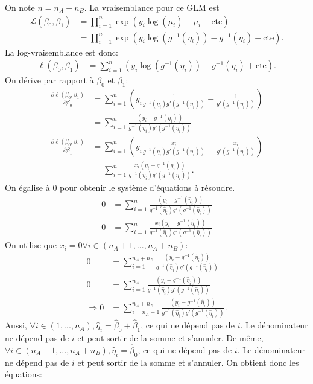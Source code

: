 \begin{solution}{6.3}
On note $n=n_A+n_B$. La vraisemblance pour ce GLM est
\begin{align*}
\mathcal{L}(\beta_0,\beta_1)&=\prod_{i=1}^n \exp(y_i\log(\mu_i)-\mu_i+\mbox{cte})\\
&=\prod_{i=1}^n \exp(y_i\log(g^{-1}(\eta_i))-g^{-1}(\eta_i)+\mbox{cte}).
\end{align*}
La log-vraisemblance est donc:
\begin{align*}
\ell(\beta_0,\beta_1)&=\sum_{i=1}^n (y_i\log(g^{-1}(\eta_i))-g^{-1}(\eta_i)+\mbox{cte}).
\end{align*}
On dérive par rapport à $\beta_0$ et $\beta_1$:
\begin{align*}
\frac{\partial \ell(\beta_0,\beta_1)}{\partial\beta_0}&=\sum_{i=1}^n (y_i\frac{1}{g^{-1}(\eta_i)g'(g^{-1}(\eta_i))}-\frac{1}{g'(g^{-1}(\eta_i))})\\
&=\sum_{i=1}^n \frac{(y_i-g^{-1}(\eta_i))}{g^{-1}(\eta_i)g'(g^{-1}(\eta_i))}\\
\frac{\partial \ell(\beta_0,\beta_1)}{\partial\beta_1}&=\sum_{i=1}^n (y_i\frac{x_i}{g^{-1}(\eta_i)g'(g^{-1}(\eta_i))}-\frac{x_i}{g'(g^{-1}(\eta_i))})\\
&=\sum_{i=1}^n \frac{ x_i(y_i-g^{-1}(\eta_i))}{g^{-1}(\eta_i)g'(g^{-1}(\eta_i))}.
\end{align*}
On égalise à 0 pour obtenir le système d'équations à résoudre.
\begin{align*}
0&=\sum_{i=1}^n \frac{(y_i-g^{-1}(\hat{\eta}_i))}{g^{-1}(\hat{\eta}_i)g'(g^{-1}(\hat{\eta}_i))}\\
0&=\sum_{i=1}^n \frac{ x_i(y_i-g^{-1}(\hat{\eta}_i))}{g^{-1}(\hat{\eta}_i)g'(g^{-1}(\hat{\eta}_i))}
\end{align*}
On utilise que $x_i=0 \forall i \in (n_A+1,...,n_A+n_B)$:
\begin{align*}
0&=\sum_{i=1}^{n_A+n_B} \frac{(y_i-g^{-1}(\hat{\eta}_i))}{g^{-1}(\hat{\eta}_i)g'(g^{-1}(\hat{\eta}_i))}\\
0&=\sum_{i=1}^{n_A} \frac{ (y_i-g^{-1}(\hat{\eta}_i))}{g^{-1}(\hat{\eta}_i)g'(g^{-1}(\hat{\eta}_i))}\\
\Rightarrow 0&= \sum_{i=n_A+1}^{n_A+n_B} \frac{ (y_i-g^{-1}(\hat{\eta}_i))}{g^{-1}(\hat{\eta}_i)g'(g^{-1}(\hat{\eta}_i))}.
\end{align*}
Aussi, $\forall i \in (1,...,n_A), \hat{\eta}_i=\hat{\beta}_0+\hat{\beta}_1$, ce qui ne dépend pas de $i$. Le dénominateur ne dépend pas de $i$ et peut sortir de la somme et s'annuler. De même, $\forall i \in (n_A+1,...,n_A+n_B), \hat{\eta}_i=\hat{\beta}_0$, ce qui ne dépend pas de $i$. Le dénominateur ne dépend pas de $i$ et peut sortir de la somme et s'annuler. On obtient donc les équations:

\end{solution}
